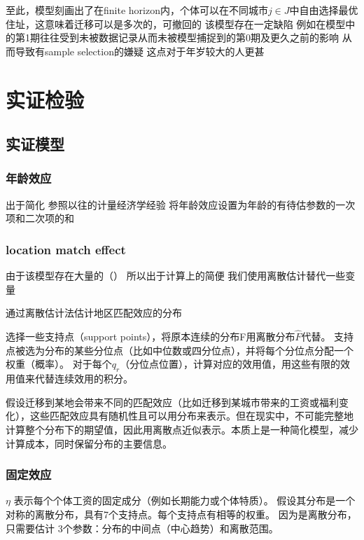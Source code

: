\documentclass[a4paper,12pt]{article}
\begin{document}
至此，模型刻画出了在finite horizon内，个体可以在不同城市$j\in J$中自由选择最优住址，这意味着迁移可以是多次的，可撤回的
该模型存在一定缺陷
例如在模型中的第1期往往受到未被数据记录从而未被模型捕捉到的第0期及更久之前的影响
从而导致有sample selection的嫌疑
这点对于年岁较大的人更甚

\section{实证检验}

\subsection{实证模型} %
\label{sub:实证模型}
\subsubsection{年龄效应}
出于简化
参照以往的计量经济学经验
将年龄效应设置为年龄的有待估参数的一次项和二次项的和

\subsubsection{location match effect}
由于该模型存在大量的（）
所以出于计算上的简便
我们使用离散估计替代一些变量

通过离散估计法估计地区匹配效应的分布

选择一些支持点（support points），将原本连续的分布F用离散分布$\hat F$代替。
支持点被选为分布的某些分位点（比如中位数或四分位点），并将每个分位点分配一个权重（概率）。
对于每个$q_r$（分位点位置），计算对应的效用值，用这些有限的效用值来代替连续效用的积分。

假设迁移到某地会带来不同的匹配效应（比如迁移到某城市带来的工资或福利变化），这些匹配效应具有随机性且可以用分布来表示。但在现实中，不可能完整地计算整个分布下的期望值，因此用离散点近似表示。本质上是一种简化模型，减少计算成本，同时保留分布的主要信息。

\subsubsection{固定效应}


$\eta$ 表示每个个体工资的固定成分（例如长期能力或个体特质）。
假设其分布是一个对称的离散分布，具有7个支持点。每个支持点有相等的权重。
因为是离散分布，只需要估计 3个参数：分布的中间点（中心趋势）和离散范围。
\end{document}

